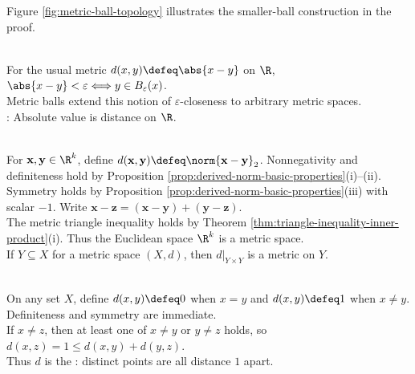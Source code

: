 \begin{illustrationfigure}[H]
  \centering
  
  \caption{Every point inside a metric ball has a smaller ball still contained in the original ball.}
  \label{fig:metric-ball-topology}
\end{illustrationfigure}
Figure \ref{fig:metric-ball-topology} illustrates the smaller-ball construction in the proof.

\begin{perspective} \label{per:epsilon-closeness-to-metric-language} \\
For the usual metric $d(x,y)\defeq\abs{x-y}$ on $\R$, $\abs{x-y}<\varepsilon\Longleftrightarrow y\in B_\varepsilon(x)$.\\
Metric balls extend this notion of $\varepsilon$-closeness to arbitrary metric spaces.\\
: Absolute value is distance on $\R$.
\end{perspective}

\begin{example} \label{ex:euclidean-metric-and-subspaces} \\
For $\mathbf{x},\mathbf{y}\in\R^k$, define $d(\mathbf{x},\mathbf{y})\defeq\norm{\mathbf{x}-\mathbf{y}}_2$. Nonnegativity and definiteness hold by Proposition \ref{prop:derived-norm-basic-properties}(i)--(ii).\\
Symmetry holds by Proposition \ref{prop:derived-norm-basic-properties}(iii) with scalar $-1$. Write $\mathbf{x}-\mathbf{z}=(\mathbf{x}-\mathbf{y})+(\mathbf{y}-\mathbf{z})$.\\
The metric triangle inequality holds by Theorem \ref{thm:triangle-inequality-inner-product}(i). Thus the Euclidean space $\R^k$ is a metric space.\\
If $Y\subseteq X$ for a metric space $(X,d)$, then $d|_{Y\times Y}$ is a metric on $Y$.
\end{example}

\begin{example} \label{ex:discrete-metric} \\
On any set $X$, define $d(x,y)\defeq0$ when $x=y$ and $d(x,y)\defeq1$ when $x\neq y$. Definiteness and symmetry are immediate.\\
If $x\neq z$, then at least one of $x\neq y$ or $y\neq z$ holds, so $d(x,z)=1\leq d(x,y)+d(y,z)$.\\
Thus $d$ is the : distinct points are all distance $1$ apart.
\end{example}

